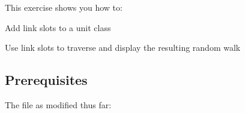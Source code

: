 \documentclass[10pt,twoside,english,pdftex]{article}
\begin{document}
\fndocrule

This exercise shows you how to:
\begin{tightitemize}
\item Add link slots to a unit class
\item Use link slots to traverse and display the resulting random walk
\end{tightitemize}

\fndocrule

\subsection*{Prerequisites}

\begin{tightitemize}
\item The  file as modified thus far:
\end{tightitemize}
%
\end{document}
